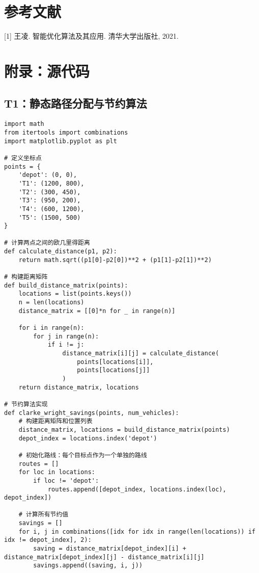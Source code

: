 \documentclass[12pt,fontset=adobe]{ctexart}
\begin{document}
\section{参考文献}
[1] 王凌. 智能优化算法及其应用. 清华大学出版社, 2021.  \\

\section*{附录：源代码}

\subsection*{T1：静态路径分配与节约算法}
\begin{verbatim}
import math
from itertools import combinations
import matplotlib.pyplot as plt

# 定义坐标点
points = {
    'depot': (0, 0),
    'T1': (1200, 800),
    'T2': (300, 450),
    'T3': (950, 200),
    'T4': (600, 1200),
    'T5': (1500, 500)
}

# 计算两点之间的欧几里得距离
def calculate_distance(p1, p2):
    return math.sqrt((p1[0]-p2[0])**2 + (p1[1]-p2[1])**2)

# 构建距离矩阵
def build_distance_matrix(points):
    locations = list(points.keys())
    n = len(locations)
    distance_matrix = [[0]*n for _ in range(n)]
    
    for i in range(n):
        for j in range(n):
            if i != j:
                distance_matrix[i][j] = calculate_distance(
                    points[locations[i]], 
                    points[locations[j]]
                )
    return distance_matrix, locations

# 节约算法实现
def clarke_wright_savings(points, num_vehicles):
    # 构建距离矩阵和位置列表
    distance_matrix, locations = build_distance_matrix(points)
    depot_index = locations.index('depot')
    
    # 初始化路线：每个目标点作为一个单独的路线
    routes = []
    for loc in locations:
        if loc != 'depot':
            routes.append([depot_index, locations.index(loc), depot_index])
    
    # 计算所有节约值
    savings = []
    for i, j in combinations([idx for idx in range(len(locations)) if idx != depot_index], 2):
        saving = distance_matrix[depot_index][i] + distance_matrix[depot_index][j] - distance_matrix[i][j]
        savings.append((saving, i, j))
    

\end{verbatim}
\end{document}
